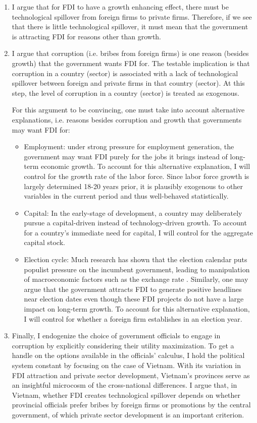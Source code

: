 \begin{enumerate}
\item I argue that for FDI to have a growth enhancing effect, there must be technological spillover from foreign firms to private firms. Therefore, if we see that there is little technological spillover, it must mean that the government is attracting FDI for reasons other than growth.

\item I argue that corruption (i.e. bribes from foreign firms) is one reason (besides growth) that the government wants FDI for. The testable implication is that corruption in a country (sector) is associated with a lack of technological spillover between foreign and private firms in that country (sector). At this step, the level of corruption in a country (sector) is treated as exogenous.

For this argument to be convincing, one must take into account alternative explanations, i.e. reasons besides corruption and growth that governments may want FDI for:
\begin{itemize} 
\item Employment: under strong pressure for employment generation, the government may want FDI purely for the jobs it brings instead of long-term economic growth. To account for this alternative explanation, I will control for the growth rate of the labor force. Since labor force growth is largely determined 18-20 years prior, it is plausibly exogenous to other variables in the current period and thus well-behaved statistically.  
\item Capital: In the early-stage of development, a country may deliberately pursue a capital-driven instead of technology-driven growth. To account for a country's immediate need for capital, I will control for the aggregate capital stock.
\item Election cycle: Much research has shown that the election calendar puts populist pressure on the incumbent government, leading to manipulation of macroeconomic factors such as the exchange rate \citep{Blomberg2001}. Similarly, one may argue that the government attracts FDI to generate positive headlines near election dates even though these FDI projects do not have a large impact on long-term growth. To account for this alternative explanation, I will control for whether a foreign firm establishes in an election year.
\end{itemize}

\item Finally, I endogenize the choice of government officials to engage in corruption by explicitly considering their utility maximization. To get a handle on the options available in the officials' calculus, I hold the political system constant by focusing on the case of Vietnam. With its variation in FDI attraction and private sector development, Vietnam's provinces serve as an insightful microcosm of the cross-national differences. I argue that, in Vietnam, whether FDI creates technological spillover depends on whether provincial officials prefer bribes by foreign firms or promotions by the central government, of which private sector development is an important criterion.
\end{enumerate}

